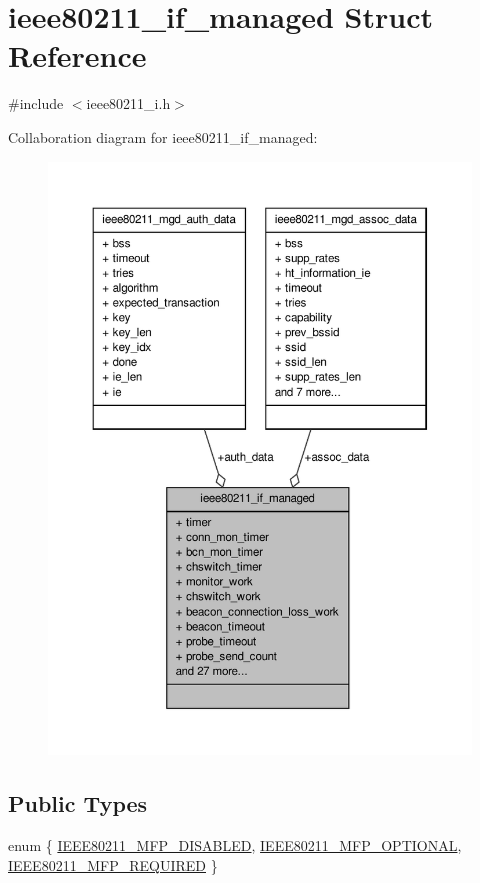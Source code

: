\hypertarget{structieee80211__if__managed}{\section{ieee80211\-\_\-if\-\_\-managed Struct Reference}
\label{structieee80211__if__managed}
}


{\ttfamily \#include $<$ieee80211\-\_\-i.\-h$>$}



Collaboration diagram for ieee80211\-\_\-if\-\_\-managed\-:
\nopagebreak
\begin{figure}[H]
\begin{center}
\leavevmode
\includegraphics[width=350pt]{structieee80211__if__managed__coll__graph}
\end{center}
\end{figure}
\subsection*{Public Types}
\begin{DoxyCompactItemize}
\item 
enum \{ \hyperlink{structieee80211__if__managed_a726ca809ffd3d67ab4b8476646f26635af6abea446efc3ba9def75c5bbbe6dae9}{I\-E\-E\-E80211\-\_\-\-M\-F\-P\-\_\-\-D\-I\-S\-A\-B\-L\-E\-D}, 
\hyperlink{structieee80211__if__managed_a726ca809ffd3d67ab4b8476646f26635a080fc00364b7117ec3a85dc127cbf3e2}{I\-E\-E\-E80211\-\_\-\-M\-F\-P\-\_\-\-O\-P\-T\-I\-O\-N\-A\-L}, 
\hyperlink{structieee80211__if__managed_a726ca809ffd3d67ab4b8476646f26635aae26246ca1efca53f8d5341eea5cd232}{I\-E\-E\-E80211\-\_\-\-M\-F\-P\-\_\-\-R\-E\-Q\-U\-I\-R\-E\-D}
 \}
\end{DoxyCompactItemize}
